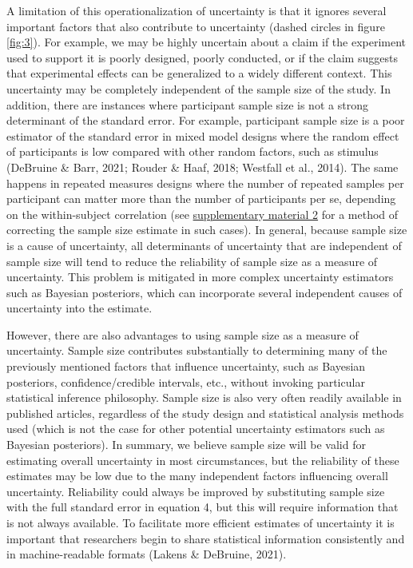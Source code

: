 \documentclass[
  english,
  jou,floatsintext]{apa6}
\begin{document}
A limitation of this operationalization of uncertainty is that it ignores several important factors that also contribute to uncertainty (dashed circles in figure \ref{fig:3}). For example, we may be highly uncertain about a claim if the experiment used to support it is poorly designed, poorly conducted, or if the claim suggests that experimental effects can be generalized to a widely different context. This uncertainty may be completely independent of the sample size of the study. In addition, there are instances where participant sample size is not a strong determinant of the standard error. For example, participant sample size is a poor estimator of the standard error in mixed model designs where the random effect of participants is low compared with other random factors, such as stimulus (DeBruine \& Barr, 2021; Rouder \& Haaf, 2018; Westfall et al., 2014). The same happens in repeated measures designs where the number of repeated samples per participant can matter more than the number of participants per se, depending on the within-subject correlation (see \href{https://osf.io/pz5qa/}{supplementary material 2} for a method of correcting the sample size estimate in such cases). In general, because sample size is a cause of uncertainty, all determinants of uncertainty that are independent of sample size will tend to reduce the reliability of sample size as a measure of uncertainty. This problem is mitigated in more complex uncertainty estimators such as Bayesian posteriors, which can incorporate several independent causes of uncertainty into the estimate.

However, there are also advantages to using sample size as a measure of uncertainty. Sample size contributes substantially to determining many of the previously mentioned factors that influence uncertainty, such as Bayesian posteriors, confidence/credible intervals, etc., without invoking particular statistical inference philosophy. Sample size is also very often readily available in published articles, regardless of the study design and statistical analysis methods used (which is not the case for other potential uncertainty estimators such as Bayesian posteriors). In summary, we believe sample size will be valid for estimating overall uncertainty in most circumstances, but the reliability of these estimates may be low due to the many independent factors influencing overall uncertainty. Reliability could always be improved by substituting sample size with the full standard error in equation 4, but this will require information that is not always available. To facilitate more efficient estimates of uncertainty it is important that researchers begin to share statistical information consistently and in machine-readable formats (Lakens \& DeBruine, 2021).
\end{document}
